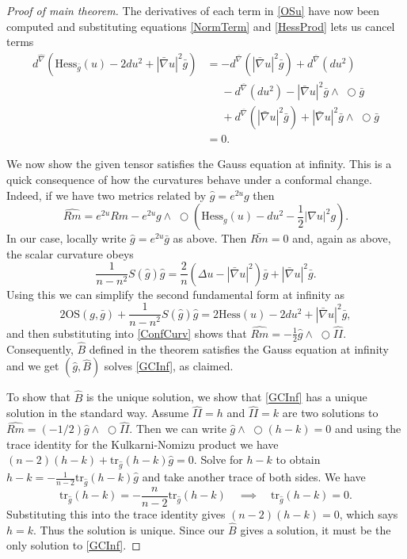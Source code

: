 \documentclass{amsart}
\newcommand{\two}{I\!\!I}
\newcommand{\tr}{\mathrm{tr}}
\newcommand{\wtimes}{\wedge \!\!\!\!\!\!\!\!\;\bigcirc}
\begin{document}
\begin{proof}[Proof of main theorem]
The derivatives of each term in \eqref{OSu} have now been computed and substituting equations \eqref{NormTerm} and \eqref{HessProd} lets us cancel terms
\begin{align*}
d^{\hat{\nabla}}\left(\mathrm{Hess}_{\bar{g}}(u) - 2 du^2 + |\bar{\nabla}u|^2 \bar{g} \right)
&= -d^{\bar{\nabla}}(|\bar{\nabla}u|^2\bar{g}) + d^{\bar{\nabla}}(du^2) \\
&\phantom{=} - d^{\bar{\nabla}}(du^2) - |\bar{\nabla}u|^2\bar{g}\wtimes\bar{g} \\
&\phantom{=} + d^{\bar{\nabla}}(|\bar{\nabla}u|^2\bar{g}) + |\bar{\nabla}u|^2\bar{g}\wtimes\bar{g} \\
&= 0.
\end{align*}

We now show the given tensor satisfies the Gauss equation at infinity.
This is a quick consequence of how the curvatures behave under a conformal change.
Indeed, if we have two metrics related by $\hat{g} = e^{2u}g$ then 
\begin{equation}
\label{ConfCurv}
\hat{Rm} = e^{2u}Rm - e^{2u}g\wtimes(\mathrm{Hess}_g(u) - du^2 - \frac{1}{2}|\nabla u|^2g).
\end{equation}
In our case, locally write $\hat{g} = e^{2u}\bar{g}$ as above.
Then $\bar{Rm} = 0$ and, again as above, the scalar curvature obeys 
\[
\frac{1}{n-n^2}S(\hat{g})\hat{g}
= \frac{2}{n}\left( \Delta u - |\bar{\nabla}u|^2\right)\bar{g} + |\bar{\nabla}u|^2\bar{g}.
\]
Using this we can simplify the second fundamental form at infinity as 
\[
2\mathrm{OS}(g,\bar{g}) + \frac{1}{n-n^2}S(\hat{g})\hat{g} 
= 2\mathrm{Hess}(u) - 2du^2 + |\bar{\nabla}u|^2\bar{g},
\]
and then substituting into \eqref{ConfCurv} shows that $\hat{Rm} = -\frac{1}{2}\hat{g}\wtimes \hat{\two}$.
Consequently, $\hat{B}$ defined in the theorem satisfies the Gauss equation at infinity and we get $(\hat{g},\hat{B})$ solves \ref{GCInf}, as claimed.

To show that $\hat{B}$ is the unique solution, we show that \ref{GCInf} has a unique solution in the standard way.
Assume $\hat{\two} = h$ and $\hat{\two} = k$ are two solutions to $\hat{Rm} = (-1/2)\hat{g}\wtimes\hat{\two}$.
Then we can write $\hat{g}\wtimes (h-k) = 0$ and using the trace identity for the Kulkarni-Nomizu product we have $(n-2)(h-k) + \tr_{\hat{g}}(h-k)\hat{g} = 0$.
Solve for $h-k$ to obtain $h-k = -\frac{1}{n-2}\tr_{\hat{g}}(h-k)\hat{g}$ and take another trace of both sides.
We have
\[
\tr_{\hat{g}}(h-k) = -\frac{n}{n-2}\tr_{\hat{g}}(h-k) \quad \implies \quad \tr_{\hat{g}}(h-k) = 0.
\]
Substituting this into the trace identity gives $(n-2)(h-k) = 0$, which says $h=k$.
Thus the solution is unique.
Since our $\hat{B}$ gives a solution, it must be the only solution to \ref{GCInf}. 
\end{proof}
\end{document}
